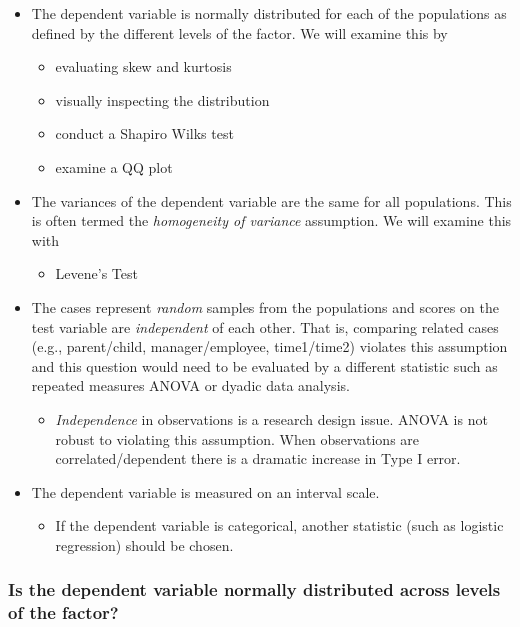\documentclass[
  11pt,
]{book}
\providecommand{\tightlist}{%
  \setlength{\itemsep}{0pt}\setlength{\parskip}{0pt}}
\begin{document}
\begin{itemize}
\tightlist
\item
  The dependent variable is normally distributed for each of the populations as defined by the different levels of the factor. We will examine this by

  \begin{itemize}
  \tightlist
  \item
    evaluating skew and kurtosis
  \item
    visually inspecting the distribution
  \item
    conduct a Shapiro Wilks test
  \item
    examine a QQ plot
  \end{itemize}
\item
  The variances of the dependent variable are the same for all populations. This is often termed the \emph{homogeneity of variance} assumption. We will examine this with

  \begin{itemize}
  \tightlist
  \item
    Levene's Test
  \end{itemize}
\item
  The cases represent \emph{random} samples from the populations and scores on the test variable are \emph{independent} of each other. That is, comparing related cases (e.g., parent/child, manager/employee, time1/time2) violates this assumption and this question would need to be evaluated by a different statistic such as repeated measures ANOVA or dyadic data analysis.

  \begin{itemize}
  \tightlist
  \item
    \emph{Independence} in observations is a research design issue. ANOVA is not robust to violating this assumption. When observations are correlated/dependent there is a dramatic increase in Type I error.
  \end{itemize}
\item
  The dependent variable is measured on an interval scale.

  \begin{itemize}
  \tightlist
  \item
    If the dependent variable is categorical, another statistic (such as logistic regression) should be chosen.
  \end{itemize}
\end{itemize}

\hypertarget{is-the-dependent-variable-normally-distributed-across-levels-of-the-factor}{%
\subsubsection{Is the dependent variable normally distributed across levels of the factor?}\label{is-the-dependent-variable-normally-distributed-across-levels-of-the-factor}}
\end{document}
